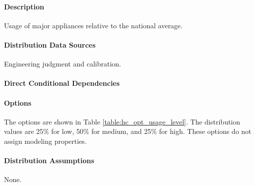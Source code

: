 \paragraph{Description}
% 
Usage of major appliances relative to the national average.

\paragraph{Distribution Data Sources}
% 
Engineering judgment and calibration.

\paragraph{Direct Conditional Dependencies}


\paragraph{Options}
The options are shown in Table \ref{table:hc_opt_usage_level}. The distribution values are 25\% for low, 50\% for medium, and 25\% for high. These options do not assign modeling properties.



\paragraph{Distribution Assumptions}
% 
None.

